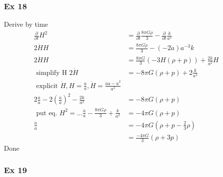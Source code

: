\subsubsection{Ex 18}
Derive by time
\begin{align*}
	\frac{\partial }{\partial t}  H^{2} &= \frac{\partial }{\partial t}  \frac{8\pi G \rho }{3} - \frac{\partial }{\partial t}  \frac{k}{a^{2}}\\
2 \dot{H}H &= \frac{8\pi G \dot{\rho }}{3} - \left( -2\dot{a} \right)a^{-3}k\\
 2\dot{H}H &= \frac{8\pi G}{3}\left( -3H\left( \rho +p \right) \right) + \frac{2k}{a^{2}}H\\
 \text{ simplify H }
 2\dot{H} &= -8 \pi G \left( \rho +p \right) + 2 \frac{k}{a^{2}}\\
 \text{ explicit } \dot{H}, H = \frac{\dot{a}}{a}, \dot{H} = \frac{\ddot{a}a - \dot{a}^{2}}{a^{2}}\\
 2 \frac{\ddot{a}}{a} - 2 \left( \frac{\dot{a}}{a} \right)^{2} - \frac{2k}{a^{2}} &= -8\pi G\left( \rho +p \right)\\
 \text{ put eq.  } H^{2} = \ldots 
 \frac{\ddot{a}}{a} - \frac{8\pi G\rho }{3}+ \frac{k}{a^{2}} &= -4\pi G\left( \rho +p \right)\\
 \frac{\ddot{a}}{a} &= -4\pi G \left( \rho +p-\frac{2}{3}\rho  \right)\\
		    &= \frac{-4\pi G}{3}\left( \rho +3p \right)
\end{align*}
Done

\subsubsection{Ex 19}

